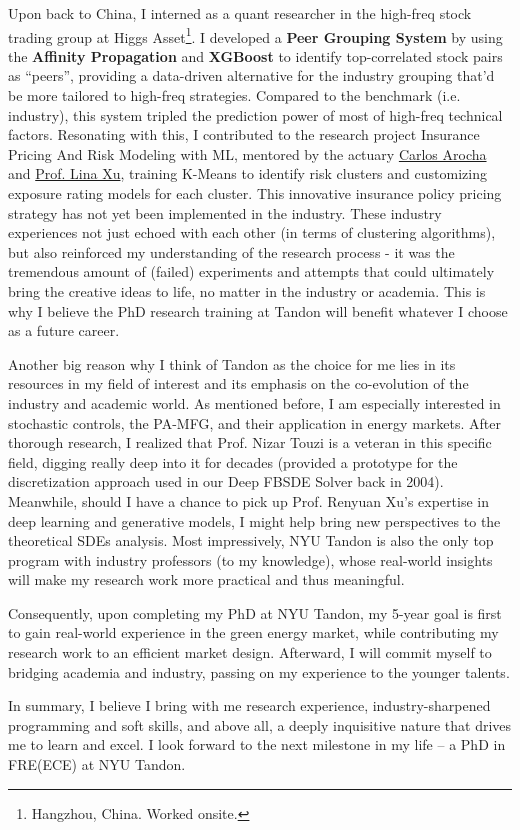 \documentclass[12pt, a4paper]{article}
\newcommand{\InsurP}{Insurance Pricing And Risk Modeling with ML\xspace}
\newcommand{\Higgs}{Higgs Asset\footnote{Hangzhou, China. Worked onsite.}\xspace}
\newcommand{\CA}{\href{https://www.linkedin.com/in/carocha/?originalSubdomain=ch}{Carlos Arocha}\xspace}
\newcommand{\LX}{\href{https://sps.columbia.edu/person/lina-xu}{Prof. Lina Xu}}
\begin{document}
Upon back to China, I interned as a quant researcher in the high-freq stock trading group at \Higgs. I developed a \textbf{Peer Grouping System} by using the \textbf{Affinity Propagation} and \textbf{XGBoost} to identify top-correlated stock pairs as “peers”, providing a data-driven alternative for the industry grouping that’d be more tailored to high-freq strategies. Compared to the benchmark (i.e. industry), this system tripled the prediction power of most of high-freq technical factors. Resonating with this, I contributed to the research project \InsurP, mentored by the actuary \CA and \LX, training K-Means to identify risk clusters and customizing exposure rating models for each cluster. This innovative insurance policy pricing strategy has not yet been implemented in the industry. These industry experiences not just echoed with each other (in terms of clustering algorithms), but also reinforced my understanding of the research process - it was the tremendous amount of (failed) experiments and attempts that could ultimately bring the creative ideas to life, no matter in the industry or academia. This is why I believe the PhD research training at Tandon will benefit whatever I choose as a future career.

Another big reason why I think of Tandon as the choice for me lies in its resources in my field of interest and its emphasis on the co-evolution of the industry and academic world. As mentioned before, I am especially interested in stochastic controls, the PA-MFG, and their application in energy markets. After thorough research, I realized that Prof. Nizar Touzi is a veteran in this specific field, digging really deep into it for decades (provided a prototype for the discretization approach used in our Deep FBSDE Solver back in 2004). Meanwhile, should I have a chance to pick up Prof. Renyuan Xu’s expertise in deep learning and generative models, I might help bring new perspectives to the theoretical SDEs analysis. Most impressively, NYU Tandon is also the only top program with industry professors (to my knowledge), whose real-world insights will make my research work more practical and thus meaningful.


Consequently, upon completing my PhD at NYU Tandon, my 5-year goal is first to gain real-world experience in the green energy market, while contributing my research work to an efficient market design. Afterward, I will commit myself to bridging academia and industry, passing on my experience to the younger talents. 


In summary, I believe I bring with me research experience, industry-sharpened programming and soft skills, and above all, a deeply inquisitive nature that drives me to learn and excel. I look forward to the next milestone in my life – a PhD in FRE(ECE) at NYU Tandon.
\end{document}
